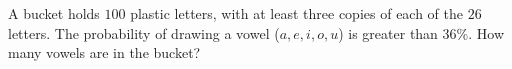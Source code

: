 A bucket holds $100$ plastic letters, with at least three copies of each of the $26$ letters. The probability of drawing a vowel ($a,e,i,o,u$) is greater than $36\%$. How many vowels are in the bucket?
